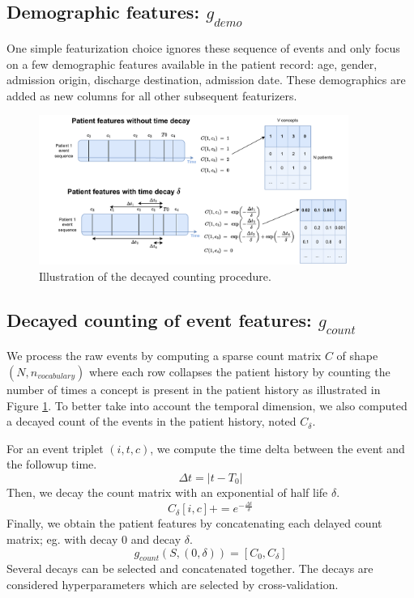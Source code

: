 \documentclass[french,12pt,twoside,a4paper]{book}
\begin{document}
\subsection{Demographic features: $g_{demo}$}\label{subsec:predictive_models:demographic}

One simple featurization choice ignores these sequence of events and only focus
on a few demographic features available in the patient record: age,
gender, admission origin, discharge destination, admission date. These
demographics are added as new columns for all other subsequent featurizers.


\begin{figure}[!b]
  \centering
  \includegraphics[width=0.9\textwidth]{img/chapter_3/patient_counter_with_decay.pdf}
  \caption{Illustration of the decayed counting
    procedure.}\label{fig:pipelines:count_encoding}
\end{figure}

\subsection{Decayed counting of event features: $g_{count}$}\label{subsec:predictive_models:count_encoding}

We process the raw events by computing a sparse count matrix $C$ of shape $(N,
  n_{vocabulary})$ where each row collapses the patient history by counting the
number of times a concept is present in the patient history as illustrated in
Figure \ref{fig:pipelines:count_encoding}. To better take into account the temporal dimension, we also computed a decayed
count of the events in the patient history, noted $C_{\delta}$.

For an event triplet $(i, t, c)$, we compute the time delta between the event
and the followup time.
$$\Delta t = |t-T_0|$$
Then, we decay the count matrix with an exponential of half life $\delta$.
$$C_{\delta}[i, c] += e^{-\frac{\Delta t}{\delta}}$$%
Finally, we obtain the patient features by concatenating each
delayed count matrix; eg. with decay 0 and decay $\delta$.
$$g_{count}(S, (0, \delta))= [C_{0}, C_{\delta}]$$%
Several decays can be selected and concatenated together. The decays are
considered hyperparameters which are selected by cross-validation.
\end{document}
